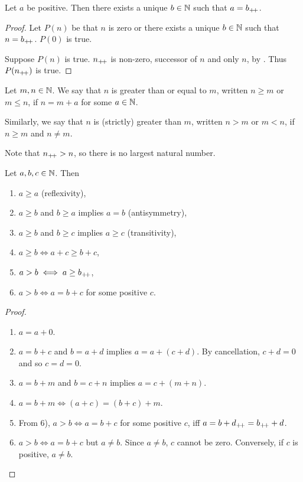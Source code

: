 \begin{exercise}
    Let $a$ be positive.
    Then there exists a unique $b \in \mathbb{N}$ such that $a = b_{+\!+}$.
\end{exercise}
\begin{proof}
    Let $P(n)$ be that $n$ is zero or there exists a unique $b \in \mathbb{N}$ such that
    $n = b_{+\!+}$.
    $P(0)$ is true.

    Suppose $P(n)$ is true.
    $n_{+\!+}$ is non-zero, successor of $n$ and only $n$, by
    .
    Thus $P(n_{+\!+})$ is true.
\end{proof}

\begin{definition*}[Order] \label{def:order}
    Let $m, n \in \mathbb{N}$.
    We say that $n$ is greater than or equal to $m$, written $n \ge m$ or
    $m \le n$, if $n = m + a$ for some $a \in \mathbb{N}$.

    Similarly, we say that $n$ is (strictly) greater than $m$, written $n > m$
    or $m < n$, if $n \ge m$ and $n \ne m$.
\end{definition*}
Note that $n_{+\!+} > n$, so there is no largest natural number.

\begin{proposition} \label{thm:N:add_properties}
    Let $a, b, c \in \mathbb{N}$. Then
    \begin{enumerate}[label=\arabic*)]
        \item $a \ge a$ (reflexivity),
        \item $a \ge b$ and $b \ge a$ implies $a = b$ (antisymmetry),
        \item $a \ge b$ and $b \ge c$ implies $a \ge c$ (transitivity),
        \item $a \ge b \iff a + c \ge b + c$,
        \item $a > b \iff a \ge b_{+\!+}$,
        \item $a > b \iff a = b + c$ for some positive $c$.
    \end{enumerate}
\end{proposition}
\begin{proof} \leavevmode
    \begin{enumerate}[label=\arabic*)]
        \item $a = a + 0$.
        \item $a = b + c$ and $b = a + d$ implies $a = a + (c + d)$.
            By cancellation, $c + d = 0$ and so $c = d = 0$.
        \item $a = b + m$ and $b = c + n$ implies $a = c + (m + n)$.
        \item $a = b + m \iff (a + c) = (b + c) + m$.
        \item From 6), $a > b \iff a = b + c$ for some positive $c$, iff
            $a = b + d_{+\!+} = b_{+\!+} + d$.
        \item $a > b \iff a = b + c$ but $a \ne b$.
            Since $a \ne b$, $c$ cannot be zero.
            Conversely, if $c$ is positive, $a \ne b$. \qedhere
    \end{enumerate}
\end{proof}

